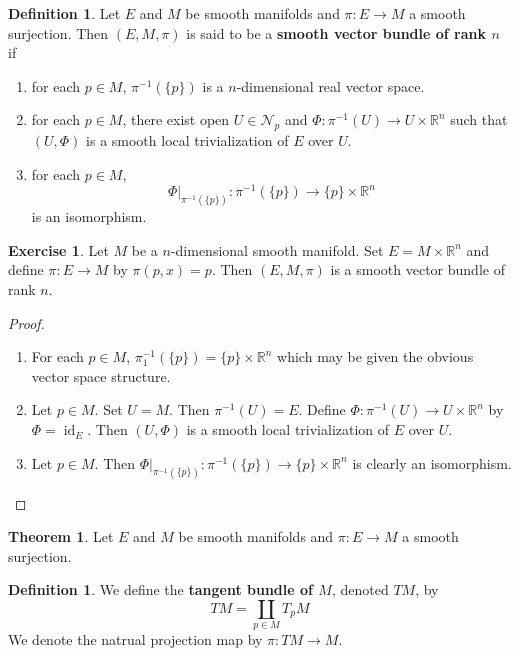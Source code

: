 \documentclass{book}
\theoremstyle{definition}
\newtheorem{defn}[definition]{Definition}
\newtheorem{thm}[definition]{Theorem}
\newtheorem{ex}[definition]{Exercise}
\newcommand{\R}{\mathbb{R}}
\newcommand{\MN}{\mathcal{N}}
\DeclareMathOperator{\id}{id}
\DeclareMathOperator*{\0}{\mbf{0}}
\DeclareMathOperator*{\1}{\mbf{1}}
\begin{document}
	\begin{defn}
		Let $E$ and $M$ be smooth manifolds and $\pi: E \rightarrow M$ a smooth surjection. Then $(E, M, \pi)$ is said to be a \textbf{smooth vector bundle of rank $n$} if 
		\begin{enumerate}
			\item for each $p \in M$, $\pi^{-1}(\{p\})$ is a $n$-dimensional real vector space.
			\item for each $p \in M$, there exist open $U \in \MN_p$ and $\Phi: \pi^{-1}(U) \rightarrow U \times \R^n$ such that $(U, \Phi)$ is a smooth local trivialization of $E$ over $U$.
			\item for each $p \in M$, $$\Phi|_{\pi^{-1}(\{p\})}: \pi^{-1}(\{p\}) \rightarrow \{p\} \times \R^n$$ is an isomorphism. 
		\end{enumerate}
	\end{defn}

\begin{ex}
Let $M$ be a $n$-dimensional smooth manifold. Set $E = M \times \R^n$ and define $\pi: E \rightarrow M$ by $\pi(p, x) = p $. Then $(E, M, \pi)$ is a smooth vector bundle of rank $n$.
\end{ex}

\begin{proof}\
\begin{enumerate}
\item For each $p \in M$, $\pi_1^{-1}(\{p\}) = \{p\} \times \R^n$ which may be given the obvious vector space structure.
\item Let $p \in M$. Set $U = M$. Then $\pi^{-1}(U) = E$. Define $\Phi: \pi^{-1}(U) \rightarrow U \times \R^n$ by $\Phi = \id_E$. Then $(U, \Phi)$ is a smooth local trivialization of $E$ over $U$.   
\item Let $p \in M$. Then $\Phi|_{\pi^{-1}(\{p\})}: \pi^{-1}(\{p\}) \rightarrow \{p\} \times \R^n$ is clearly an isomorphism. 
\end{enumerate}
\end{proof}

	\begin{thm}
		Let $E$ and $M$ be smooth manifolds and $\pi: E \rightarrow M$ a smooth surjection.
	\end{thm}
	
	
	\newpage
	
	\begin{defn}
		We define the \textbf{tangent bundle of $M$}, denoted $TM$, by $$TM = \coprod_{p \in M} T_pM$$ 
		We denote the natrual projection map by $\pi: TM \rightarrow M$.
	\end{defn}
	
\end{document}

